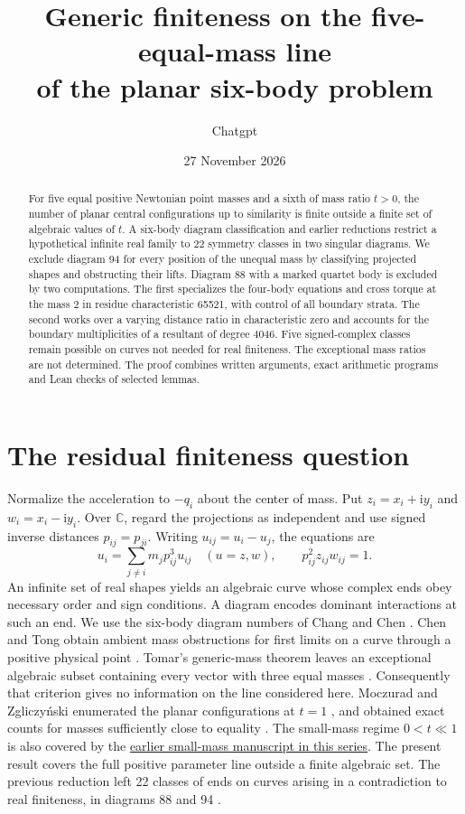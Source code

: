 \documentclass[11pt]{article}
\title{Generic finiteness on the five-equal-mass line\\of the planar six-body problem}
\author{Chatgpt}
\date{27 November 2026}
\newcommand{\C}{\mathbb C}
\begin{document}
\maketitle
\begin{abstract}
For five equal positive Newtonian point masses and a sixth of mass ratio $t>0$, the number of planar central configurations up to similarity is finite outside a finite set of algebraic values of $t$. A six-body diagram classification and earlier reductions restrict a hypothetical infinite real family to 22 symmetry classes in two singular diagrams. We exclude diagram 94 for every position of the unequal mass by classifying projected shapes and obstructing their lifts. Diagram 88 with a marked quartet body is excluded by two computations. The first specializes the four-body equations and cross torque at the mass $2$ in residue characteristic 65521, with control of all boundary strata. The second works over a varying distance ratio in characteristic zero and accounts for the boundary multiplicities of a resultant of degree 4046. Five signed-complex classes remain possible on curves not needed for real finiteness. The exceptional mass ratios are not determined. The proof combines written arguments, exact arithmetic programs and Lean checks of selected lemmas.
\end{abstract}

\section{The residual finiteness question}
Normalize the acceleration to $-q_i$ about the center of mass. Put $z_i=x_i+\mathrm i y_i$ and $w_i=x_i-\mathrm i y_i$. Over $\C$, regard the projections as independent and use signed inverse distances $p_{ij}=p_{ji}$. Writing $u_{ij}=u_i-u_j$, the equations are
\begin{equation}\label{system}
 u_i=\sum_{j\ne i}m_jp_{ij}^3u_{ij}\quad (u=z,w),\qquad p_{ij}^2 z_{ij}w_{ij}=1 .
\end{equation}
An infinite set of real shapes yields an algebraic curve whose complex ends obey necessary order and sign conditions. A diagram encodes dominant interactions at such an end. We use the six-body diagram numbers of Chang and Chen \cite{CC}. Chen and Tong obtain ambient mass obstructions for first limits on a curve through a positive physical point \cite[Thm.~1.1, Cor.~1.2]{CT}. Tomar's generic-mass theorem leaves an exceptional algebraic subset containing every vector with three equal masses \cite{Tomar}. Consequently that criterion gives no information on the line considered here. Moczurad and Zgliczy\'nski enumerated the planar configurations at $t=1$ \cite{MZplanar}, and obtained exact counts for masses sufficiently close to equality \cite{MZnear}. The small-mass regime $0<t\ll1$ is also covered by the \href{https://github.com/rongyulin/physics-open-problems-AI/blob/main/problems/planar-central-configurations/papers/SmallMass.pdf}{earlier small-mass manuscript in this series}. The present result covers the full positive parameter line outside a finite algebraic set. The previous reduction left 22 classes of ends on curves arising in a contradiction to real finiteness, in diagrams 88 and 94 \cite{Previous}.
\end{document}
